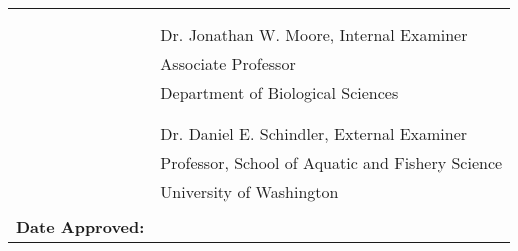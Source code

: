 \begin{tabular}{ l p{94mm} }
    & \\

    & \\ \cline{2-2}
    & Dr. Jonathan W. Moore, Internal Examiner \\
    & Associate Professor \\
    & Department of Biological Sciences \\

    & \\

    & \\ \cline{2-2}
    & Dr. Daniel E. Schindler, External Examiner \\
    & Professor, School of Aquatic and Fishery Science \\
    & University of Washington \\

    & \\
  \textbf{Date Approved:}  & \\  \cline{2-2}
\end{tabular}


